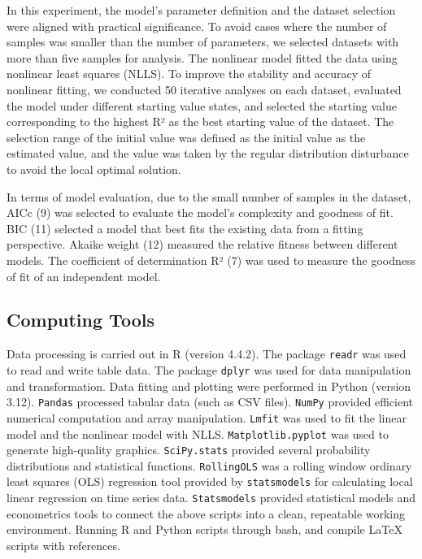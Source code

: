 \documentclass{article}
\begin{document}
In this experiment, the model’s parameter definition and the dataset selection were aligned with practical significance. To avoid cases where the number of samples was smaller than the number of parameters, we selected datasets with more than five samples for analysis. The nonlinear model fitted the data using nonlinear least squares (NLLS). To improve the stability and accuracy of nonlinear fitting, we conducted 50 iterative analyses on each dataset, evaluated the model under different starting value states, and selected the starting value corresponding to the highest R² as the best starting value of the dataset. The selection range of the initial value was defined as the initial value as the estimated value, and the value was taken by the regular distribution disturbance to avoid the local optimal solution.

In terms of model evaluation, due to the small number of samples in the dataset, AICc (9) was selected to evaluate the model's complexity and goodness of fit. BIC (11) selected a model that best fits the existing data from a fitting perspective. Akaike weight (12) measured the relative fitness between different models. The coefficient of determination R² (7) was used to measure the goodness of fit of an independent model.

\subsection{Computing Tools}

Data processing is carried out in R (version 4.4.2). The package \texttt{readr} was used to read and write table data. The package \texttt{dplyr} was used for data manipulation and transformation. Data fitting and plotting were performed in Python (version 3.12). \texttt{Pandas} processed tabular data (such as CSV files). \texttt{NumPy} provided efficient numerical computation and array manipulation. \texttt{Lmfit} was used to fit the linear model and the nonlinear model with NLLS. \texttt{Matplotlib.pyplot} was used to generate high-quality graphics. \texttt{SciPy.stats} provided several probability distributions and statistical functions. \texttt{RollingOLS} was a rolling window ordinary least squares (OLS) regression tool provided by \texttt{statsmodels} for calculating local linear regression on time series data. \texttt{Statsmodels} provided statistical models and econometrics tools to connect the above scripts into a clean, repeatable working environment. Running R and Python scripts through bash, and compile LaTeX scripts with references.
\end{document}
